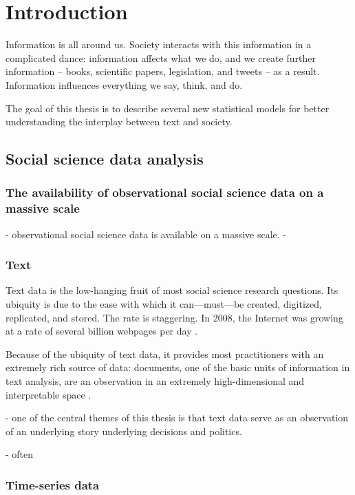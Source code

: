 \chapter{Introduction}

Information is all around us.  Society interacts with this information
in a complicated dance: information affects what we do, and we create
further information -- books, scientific papers, legislation, and
tweets -- as a result.  Information influences everything we say,
think, and do.

The goal of this thesis is to describe several new statistical models
for better understanding the interplay between text and society.

\section{Social science data analysis}

\subsection*{The availability of observational social science data on a massive scale}
  - observational social science data is available on a massive scale. \cite{lazer:2009}
  - 

\subsection*{Text}
Text data is the low-hanging fruit of most social science research
questions.  Its ubiquity is due to the ease with which it
can---must---be created, digitized, replicated, and stored.  The rate
is staggering.  In 2008, the Internet was growing at a rate of several
billion webpages per day \cite{googleblog:2008}.

Because of the ubiquity of text data, it provides most practitioners
with an extremely rich source of data: documents, one of the basic
units of information in text analysis, are an observation in an
extremely high-dimensional and interpretable space
\cite{changrtl:2009}.

- one of the central themes of this thesis is that text data serve as an observation of an underlying story underlying decisions and politics.

- often

\subsection*{Time-series data}

